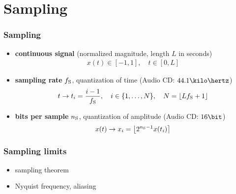 
\section{Sampling}

\begin{frame}
	\frametitle{Sampling}
	\begin{itemize}
		\item \textbf{continuous signal} (normalized magnitude, length $L$ in seconds)
			\begin{align*}
				x(t)\in[-1,1],\quad t\in[0,L]
			\end{align*}
		\item \textbf{sampling rate} $f_{\textrm S}$, quantization of time (Audio CD: $44.1\kilo\hertz$)
			\begin{align*}
				t\rightarrow t_i=\frac{i-1}{f_{\textrm S}},\quad i\in\{1,\ldots,N\},\quad N=\lfloor Lf_{\textrm S}+1\rfloor
			\end{align*}
		\item \textbf{bits per sample} $n_{\textrm S}$, quantization of amplitude (Audio CD: $16\bit$)
			\begin{align*}
				x(t)\rightarrow x_i=\left\lfloor2^{n_{\textrm S}-1}x(t_i)\right\rceil
			\end{align*}
	\end{itemize}
\end{frame}

\begin{frame}
	\frametitle{Sampling limits}
	\begin{itemize}
		\item sampling theorem
		\item Nyquist frequency, aliasing
	\end{itemize}
\end{frame}

